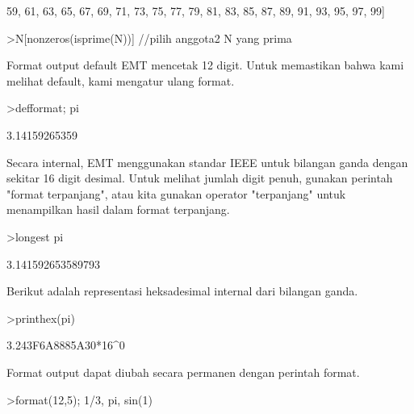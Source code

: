 \documentclass[a4paper,10pt]{article}
\begin{document}
\begin{eulernotebook}
\begin{eulercomment}
\begin{eulercomment}
\begin{euleroutput}
  59,  61,  63,  65,  67,  69,  71,  73,  75,  77,  79,  81,  83,  85,
  87,  89,  91,  93,  95,  97,  99]
\end{euleroutput}
\begin{eulerprompt}
>N[nonzeros(isprime(N))] //pilih anggota2 N yang prima
\end{eulerprompt}
\begin{euleroutput}
  [2,  3,  5,  7,  11,  13,  17,  19,  23,  29,  31,  37,  41,  43,  47,
  53,  59,  61,  67,  71,  73,  79,  83,  89,  97]
\end{euleroutput}
\begin{eulercomment}
Format output default EMT mencetak 12 digit. Untuk memastikan bahwa
kami melihat default, kami mengatur ulang format.
\end{eulercomment}
\begin{eulerprompt}
>defformat; pi
\end{eulerprompt}
\begin{euleroutput}
  3.14159265359
\end{euleroutput}
\begin{eulercomment}
Secara internal, EMT menggunakan standar IEEE untuk bilangan ganda
dengan sekitar 16 digit desimal. Untuk melihat jumlah digit penuh,
gunakan perintah "format terpanjang", atau kita gunakan operator
"terpanjang" untuk menampilkan hasil dalam format terpanjang.
\end{eulercomment}
\begin{eulerprompt}
>longest pi
\end{eulerprompt}
\begin{euleroutput}
        3.141592653589793 
\end{euleroutput}
\begin{eulercomment}
Berikut adalah representasi heksadesimal internal dari bilangan ganda.
\end{eulercomment}
\begin{eulerprompt}
>printhex(pi)
\end{eulerprompt}
\begin{euleroutput}
  3.243F6A8885A30*16^0
\end{euleroutput}
\begin{eulercomment}
Format output dapat diubah secara permanen dengan perintah format.
\end{eulercomment}
\begin{eulerprompt}
>format(12,5); 1/3, pi, sin(1)
\end{eulerprompt}
\begin{euleroutput}

\end{euleroutput}
\end{eulercomment}
\end{eulercomment}
\end{eulernotebook}
\end{document}
